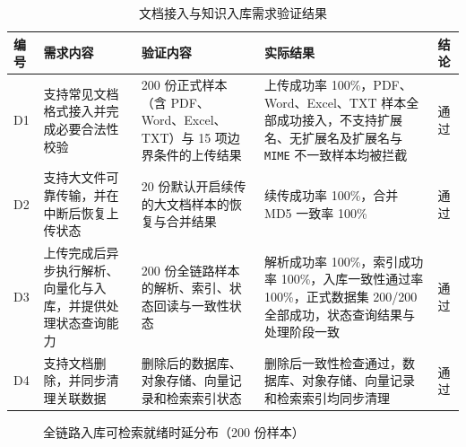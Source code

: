 \begin{table}[!htbp]
    \centering
    \caption{文档接入与知识入库需求验证结果}
    \label{tab:doc-ingest-test}
    {\small
    \begin{tabularx}{\textwidth}{L{1.2cm}L{3.8cm}L{3.6cm}Y L{1.4cm}}
        \toprule
        编号 & 需求内容 & 验证内容 & 实际结果 & 结论 \\
        \midrule
        D1 & 支持常见文档格式接入并完成必要合法性校验 & 200 份正式样本（含 PDF、Word、Excel、TXT）与 15 项边界条件的上传结果 & 上传成功率 100\%，PDF、Word、Excel、TXT 样本全部成功接入，不支持扩展名、无扩展名及扩展名与 \texttt{MIME} 不一致样本均被拦截 & 通过 \\
        D2 & 支持大文件可靠传输，并在中断后恢复上传状态 & 20 份默认开启续传的大文档样本的恢复与合并结果 & 续传成功率 100\%，合并 MD5 一致率 100\% & 通过 \\
        D3 & 上传完成后异步执行解析、向量化与入库，并提供处理状态查询能力 & 200 份全链路样本的解析、索引、状态回读与一致性状态 & 解析成功率 100\%，索引成功率 100\%，入库一致性通过率 100\%，正式数据集 200/200 全部成功，状态查询结果与处理阶段一致 & 通过 \\
        D4 & 支持文档删除，并同步清理关联数据 & 删除后的数据库、对象存储、向量记录和检索索引状态 & 删除后一致性检查通过，数据库、对象存储、向量记录和检索索引均同步清理 & 通过 \\
        \bottomrule
    \end{tabularx}
    }
\end{table}

\begin{figure}[!htbp]
    \centering
    \caption{全链路入库可检索就绪时延分布（200 份样本）}
    \label{fig:ingest-latency-histogram}
\end{figure}

